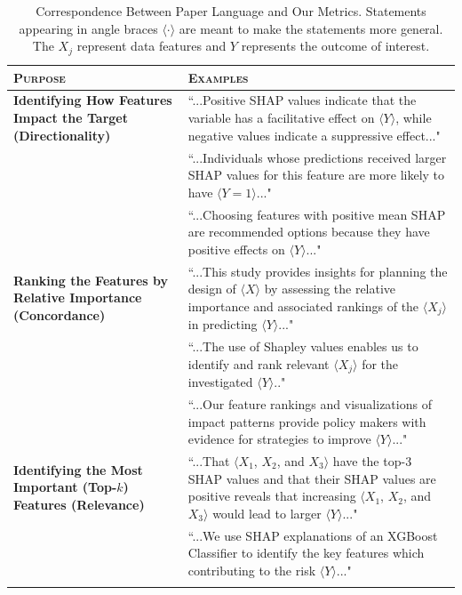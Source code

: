 \documentclass[mnsc,blindrev]{informs3}
\begin{document}
\begin{table}[htbp]
\small
\caption{Correspondence Between Paper Language and Our Metrics. Statements appearing in angle braces $\langle \cdot \rangle$ 
are meant to make the statements more general. The $X_j$ represent data features and $Y$ represents the outcome of interest.}
\begin{tabu} to 1
\toprule
\textsc{Purpose} & \textsc{Examples} \\
\hline
\textbf{Identifying How Features Impact the Target (Directionality)}
& ``...Positive SHAP values indicate that the variable has a facilitative effect on $\langle Y\rangle$, while negative values indicate a suppressive effect..." \\ 
& \vspace{-.8cm}``...Individuals whose predictions received larger SHAP values for this feature are more likely to have $\langle Y=1\rangle$..."\\
& ``...Choosing features with positive mean SHAP are recommended options because they have positive effects on $\langle Y\rangle$..." \\
\hline
\textbf{Ranking the Features by Relative Importance (Concordance)}
& ``...This study provides insights for planning the design of $\langle X\rangle$ by assessing the relative importance and associated rankings of the $\langle X_j\rangle$ in predicting $\langle Y\rangle$..."\\\smallskip
& \vspace{-1.3cm}``...The use of Shapley values enables us to identify and rank relevant $\langle X_j\rangle$ for the investigated $\langle Y\rangle$.."\\\smallskip
& \vspace{-.7cm}``...Our feature rankings and visualizations of impact patterns provide policy makers with evidence for strategies to improve $\langle Y\rangle$..." \\
\hline
\textbf{Identifying the Most Important (Top-$k$) Features (Relevance)\hspace{3cm}}
& ``...That $\langle X_1$, $X_2$, and $X_3\rangle$ have the top-3 SHAP values and that their SHAP values are positive reveals that increasing $\langle X_1$, $X_2$, and $X_3\rangle$ would lead to larger $\langle Y\rangle$..."\\\smallskip
& \vspace{-.8cm}``...We use SHAP explanations of an XGBoost Classifier to identify the key features which contributing to the risk $\langle Y\rangle$..."\\\smallskip

\end{tabu}
\end{table}
\end{document}
